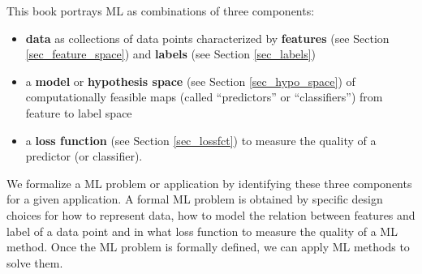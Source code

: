 \documentclass[12pt]{report}
\begin{document}
%
%
%
This book portrays ML as combinations of three components: 
\begin{itemize}
	\item {\bf data} as collections of data points characterized by {\bf features} (see Section \ref{sec_feature_space}) and {\bf labels} (see Section \ref{sec_labels}) 
	\item a {\bf model} or {\bf hypothesis space} (see Section \ref{sec_hypo_space}) of computationally 
	feasible maps (called ``predictors'' or ``classifiers'') from feature to label space 
	\item a {\bf loss function} (see Section \ref{sec_lossfct}) to measure the quality of a predictor (or classifier). 
\end{itemize}
We formalize a ML problem or application by identifying these three 
components for a given application. A formal ML problem is obtained 
by specific design choices for how to represent data, how to model 
the relation between features and label of a data point and in what 
loss function to measure the quality of a ML method. Once the ML 
problem is formally defined, we can apply ML methods to solve them. 
\end{document}

